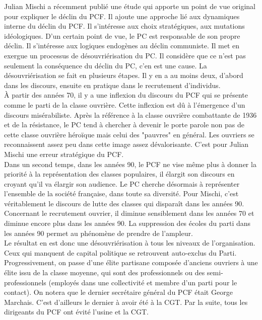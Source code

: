 \documentclass[10pt, a4paper, openany]{book}
\begin{document}
Julian Mischi a récemment publié une étude qui apporte un point de vue original pour expliquer le déclin du PCF. Il ajoute une approche lié aux dynamiques interne du déclin du PCF. Il s'intéresse aux choix stratégiques, aux mutations idéologiques. D'un certain point de vue, le PC est responsable de son propre déclin. Il s'intéresse aux logiques endogènes au déclin communiste. Il met en exergue un processus de désouvriérisation du PC. Il considère que ce n'est pas seulement la conséquence du déclin du PC, c'en est une cause. La désouvriérisation se fait en plusieurs étapes. Il y en a au moins deux, d'abord dans les discours, ensuite en pratique dans le recrutement d'individus. \\
À partir des années 70, il y a une inflexion du discours du PCF qui se présente comme le parti de la classe ouvrière. Cette inflexion est dû à l'émergence d'un discours misérabiliste. Après la référence à la classe ouvrière combattante de 1936 et de la résistance, le PC tend à chercher à devenir le porte parole non pas de cette classe ouvrière héroïque mais celui des "pauvres" en général. Les ouvriers se reconnaissent assez peu dans cette image assez dévalorisante. C'est pour Julian Mischi une erreur stratégique du PCF. \\
Dans un second temps, dans les années 90, le PCF ne vise même plus à donner la priorité à la représentation des classes populaires, il élargit son discours en croyant qu'il va élargir son audience. Le PC cherche désormais à représenter l'ensemble de la société française, dans toute sa diversité. Pour Mischi, c'est véritablement le discours de lutte des classes qui disparaît dans les années 90. \\
Concernant le recrutement ouvrier, il diminue sensiblement dans les années 70 et diminue encore plus dans les années 90. La suppression des écoles du parti dans les années 90 permet au phénomène de prendre de l'ampleur. \\
Le résultat en est donc une désouvriérisation à tous les niveaux de l'organisation. Ceux qui manquent de capital politique se retrouvent auto-exclus du Parti. \\
Progressivement, on passe d'une élite partisane composée d'anciens ouvriers à une élite issu de la classe moyenne, qui sont des professionnels ou des semi-professionnels (employés dans une collectivité et membre d'un parti pour le contact). On notera que le dernier secrétaire général du PCF était George Marchais. C'est d'ailleurs le dernier à avoir été à la CGT. Par la suite, tous les dirigeants du PCF ont évité l'usine et la CGT. \\
\end{document}
